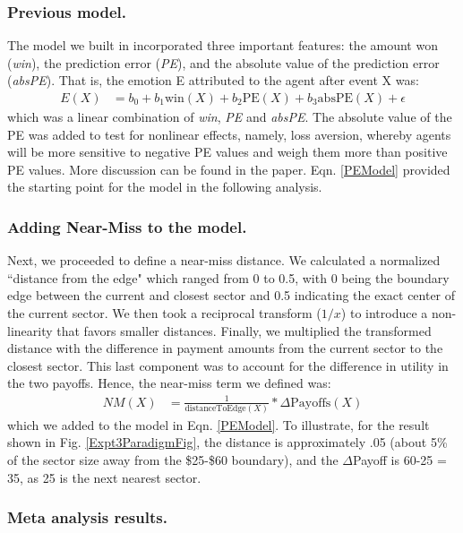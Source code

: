 \documentclass[10pt,letterpaper]{article}
\begin{document}
\subsubsection{Previous model.} The model we built in  incorporated three important features: the amount won (\textit{win}), the prediction error (\textit{PE}), and the absolute value of the prediction error (\textit{absPE}). That is, the emotion E attributed to the agent after event X was:
\begin{align}
E(X) &= b_0 + b_1 \text{win}(X) + b_2 \text{PE}(X) + b_3 \text{absPE}(X) + \epsilon \label{PEModel}
\end{align}
which was a linear combination of \textit{win}, \textit{PE} and \textit{absPE}. The absolute value of the PE was added to test for nonlinear effects, namely, loss aversion, whereby agents will be more sensitive to negative PE values and weigh them more than positive PE values. More discussion can be found in the paper. Eqn. \ref{PEModel} provided the starting point for the model in the following analysis.


\subsubsection{Adding Near-Miss to the model.}

Next, we proceeded to define a near-miss distance. We calculated a normalized ``distance from the edge" which ranged from 0 to 0.5, with 0 being the boundary edge between the current and closest sector and 0.5 indicating the exact center of the current sector. We then took a reciprocal transform ($1/x$) to introduce a non-linearity that favors smaller distances. Finally, we multiplied the transformed distance with the difference in payment amounts from the current sector to the closest sector. This last component was to account for the difference in utility in the two payoffs. Hence, the near-miss term we defined was:
\begin{align}
NM(X) &= \frac{1}{\text{distanceToEdge}(X)} * \Delta\text{Payoffs}(X) \label{NMRegressor}
\end{align}
which we added to the model in Eqn. \ref{PEModel}. To illustrate, for the result shown in Fig. \ref{Expt3ParadigmFig}, the distance is approximately .05 (about 5\% of the sector size away from the \$25-\$60 boundary), and the $\Delta$Payoff is 60-25 = 35, as 25 is the next nearest sector.

\subsubsection{Meta analysis results.}
\end{document}
